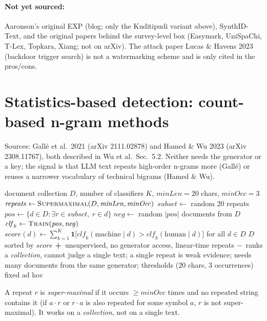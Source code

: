 \documentclass[10pt,a4paper,twocolumn]{article}
\newcommand{\pro}[1]{\Statex\textcolor{proc}{\textbf{+}\ #1}}
\newcommand{\con}[1]{\Statex\textcolor{conc}{\textbf{$-$}\ #1}}
\begin{document}
\paragraph{Not yet sourced:} Aaronson's original EXP (blog; only the Kuditipudi variant above), SynthID-Text, and the original papers behind the survey-level box (Easymark, UniSpaChi, T-Lex, Topkara, Xiang; not on arXiv). The attack paper Lucas \& Havens 2023 (backdoor trigger search) is not a watermarking scheme and is only cited in the pros/cons.

\section{Statistics-based detection: count-based n-gram methods}
Sources: Gall\'e et al.\ 2021 (arXiv 2111.02878) and Hamed \& Wu 2023 (arXiv 2308.11767), both described in Wu et al.\ Sec.~5.2. Neither needs the generator or a key; the signal is that LLM text repeats high-order n-grams more (Gall\'e) or reuses a narrower vocabulary of technical bigrams (Hamed \& Wu).

\begin{algorithm}[H]\small
\caption{Repeat-based self-training detector (Gall\'e et al.\ 2021)}
\begin{algorithmic}[1]
\Require document collection $D$, number of classifiers $K$, $\mathit{minLen}=20$ chars, $\mathit{minOcc}=3$
 \State $\mathit{repeats}\gets\textsc{Supermaximal}(D,\mathit{minLen},\mathit{minOcc})$ 
  \State $\mathit{subset}\gets$ random 20 repeats
  \State $\mathit{pos}\gets\{d\in D:\exists r\in\mathit{subset},\ r\in d\}$ 
  \State $\mathit{neg}\gets$ random $|\mathit{pos}|$ documents from $D$ 
  \State $\mathit{clf}_k\gets\textsc{Train}(\mathit{pos},\mathit{neg})$ 
 \EndFor
 \State $\mathit{score}(d)\gets\sum_{k=1}^K\mathbf 1\big[\mathit{clf}_k(\mathrm{machine}\mid d)>\mathit{clf}_k(\mathrm{human}\mid d)\big]$ for all $d\in D$
 \State \Return $D$ sorted by $\mathit{score}$ 
\EndFunction
\pro{unsupervised, no generator access, linear-time repeats}
\con{ranks a \emph{collection}, cannot judge a single text; a single repeat is weak evidence; needs many documents from the same generator; thresholds (20 chars, 3 occurrences) fixed ad hoc}
\end{algorithmic}
\end{algorithm}
A repeat $r$ is \emph{super-maximal} if it occurs $\ge\mathit{minOcc}$ times and no repeated string contains it (if $a\!\cdot\! r$ or $r\!\cdot\! a$ is also repeated for some symbol $a$, $r$ is not super-maximal). It works on a \emph{collection}, not on a single text.
\end{document}
